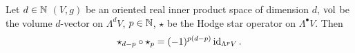 \begin{proposition}
  Let
    $d \in \mathbb{N}$
    $(V, g)$ be an oriented real inner product space of dimension $d$,
    $\mathop{\rm vol}\nolimits$ be the volume $d$-vector on $\Lambda^d V$,
    $p \in \mathbb{N}$,
    $\star$ be the Hodge star operator on $\Lambda^\bullet V$.
  Then
  \begin{equation}
    \star_{d - p} \circ \star_p = (-1)^{p (d - p)} \mathop{\rm id}\nolimits_{\Lambda^p V}.
  \end{equation}
\end{proposition}
